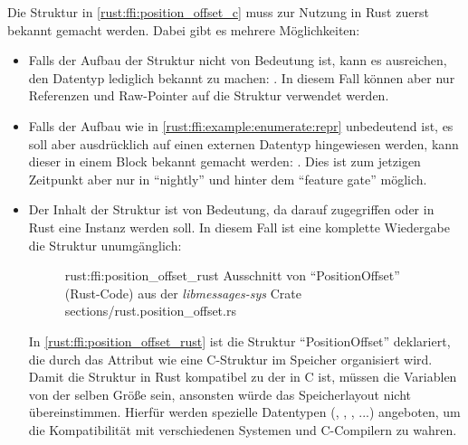 Die Struktur in \autoref{rust:ffi:position_offset_c} muss zur Nutzung in Rust zuerst bekannt gemacht werden.
Dabei gibt es mehrere Möglichkeiten:
\begin{itemize}
	\item Falls der Aufbau der Struktur nicht von Bedeutung ist, kann es ausreichen, den Datentyp lediglich bekannt zu machen: .
	In diesem Fall können aber nur Referenzen und Raw-Pointer auf die Struktur verwendet werden.
	\label{rust:ffi:example:enumerate:repr}
	
	\item Falls der Aufbau wie in \autoref{rust:ffi:example:enumerate:repr} unbedeutend ist, es soll aber ausdrücklich auf einen externen Datentyp hingewiesen werden, kann dieser in einem  Block bekannt gemacht werden:  \cite{rust:github:extern_type}.
	Dies ist zum jetzigen Zeitpunkt aber nur in \enquote{nightly} und hinter dem \enquote{feature gate}  möglich.
	
	\item Der Inhalt der Struktur ist von Bedeutung, da darauf zugegriffen oder in Rust eine Instanz werden soll. In diesem Fall ist eine komplette Wiedergabe die Struktur unumgänglich:
	\begin{figure}[H]
		\rustcinclude
			{rust:ffi:position_offset_rust}
			{Ausschnitt von \enquote{PositionOffset} (Rust-Code) aus der \textit{libmessages-sys} Crate}
			{sections/rust.position_offset.rs}
	\end{figure}
	
	In \autoref{rust:ffi:position_offset_rust} ist die Struktur \enquote{PositionOffset} deklariert,
	die durch das Attribut \rustcinline{#[repr(C)]} wie eine C-Struktur im Speicher organisiert wird.
	Damit die Struktur in Rust kompatibel zu der in C ist, müssen die Variablen von der selben Größe sein, ansonsten würde das Speicherlayout nicht übereinstimmen.
	Hierfür werden spezielle Datentypen (, , , ...) angeboten, um die Kompatibilität mit verschiedenen Systemen und C-Compilern zu wahren.
	
	
	

\end{itemize}
